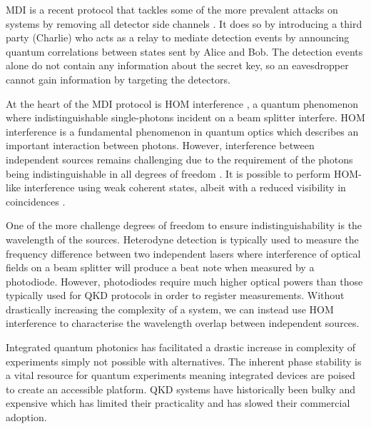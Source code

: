 \Ac{MDI} is a recent protocol that tackles some of the more prevalent attacks on systems by removing all detector side channels \cite{mdi-qkd}. It does so by introducing a third party (Charlie) who acts as a relay to mediate detection events by announcing quantum correlations between states sent by Alice and Bob. The detection events alone do not contain any information about the secret key, so an eavesdropper cannot gain information by targeting the detectors. 

At the heart of the \Ac{MDI} protocol is \ac{HOM} interference \cite{HOM}, a quantum phenomenon where indistinguishable single-photons incident on a beam splitter interfere. \ac{HOM} interference is a fundamental phenomenon in quantum optics which describes an important interaction between photons. However, interference between independent sources remains challenging due to the requirement of the photons being indistinguishable in all degrees of freedom \cite{Xu2013}. It is possible to perform \ac{HOM}-like interference using weak coherent states, albeit with a reduced visibility in coincidences \cite{Rarity2005}. 

One of the more challenge degrees of freedom to ensure indistinguishability is the wavelength of the sources. Heterodyne detection is typically used to measure the frequency difference between two independent lasers where interference of optical fields on a beam splitter will produce a beat note when measured by a photodiode. However, photodiodes require much higher optical powers than those typically used for QKD protocols in order to register measurements. Without drastically increasing the complexity of a system, we can instead use \ac{HOM} interference to characterise the wavelength overlap between independent sources.




Integrated quantum photonics has facilitated a drastic increase in complexity of experiments simply not possible with alternatives. The inherent phase stability is a vital resource for quantum experiments meaning integrated devices are poised to create an accessible platform. \Ac{QKD} systems have historically been bulky and expensive which has limited their practicality and has slowed their commercial adoption. 

